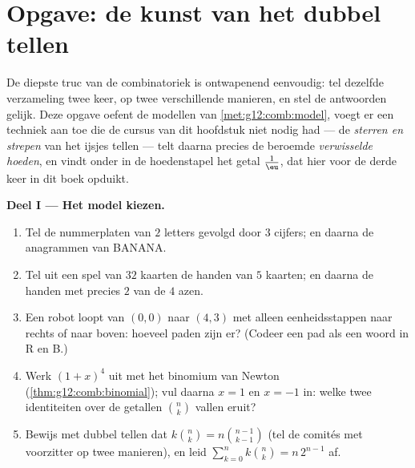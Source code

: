 \section{Opgave: de kunst van het dubbel tellen}

\begin{problem}
\label{pb:g12:comb:1}
De diepste truc van de combinatoriek is ontwapenend eenvoudig: tel dezelfde
verzameling twee keer, op twee verschillende manieren, en stel de antwoorden
gelijk. Deze opgave oefent de modellen van \cref{met:g12:comb:model}, voegt
er een techniek aan toe die de cursus van dit hoofdstuk niet nodig had --- de
\emph{sterren en strepen} van het ijsjes tellen --- telt daarna precies de
beroemde \emph{verwisselde hoeden}, en vindt onder in de hoedenstapel het
getal $\frac1\eu$, dat hier voor de derde keer in dit boek opduikt.

\medskip
\noindent\textbf{Deel I --- Het model kiezen.}
\begin{enumerate}
  \item Tel de nummerplaten van $2$ letters gevolgd door $3$ cijfers; en
        daarna de anagrammen van BANANA.
  \item Tel uit een spel van $32$ kaarten de handen van $5$ kaarten; en
        daarna de handen met precies $2$ van de $4$ azen.
  \item Een robot loopt van $(0,0)$ naar $(4,3)$ met alleen
        eenheidsstappen naar rechts of naar boven: hoeveel paden zijn er?
        (Codeer een pad als een woord in R en B.)
  \item Werk $(1 + x)^4$ uit met het binomium van Newton
        (\cref{thm:g12:comb:binomial}); vul daarna $x = 1$ en $x = -1$ in:
        welke twee identiteiten over de getallen $\binom nk$ vallen eruit?
  \item Bewijs met dubbel tellen dat $k\binom nk = n\binom{n-1}{k-1}$ (tel de
        comités met voorzitter op twee manieren), en leid
        $\sum_{k=0}^{n} k\binom nk = n\,2^{n-1}$ af.
\end{enumerate}


\end{problem}
